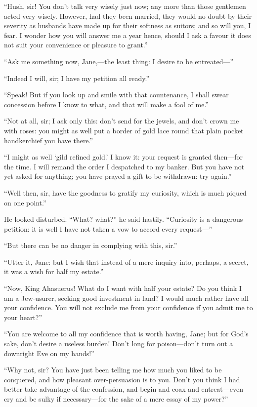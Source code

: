 \enquote{Hush, sir!  You don't talk very wisely just now; any more than
those gentlemen acted very wisely.  However, had they been married, they
would no doubt by their severity as husbands have made up for their
softness as suitors; and so will you, I fear.  I wonder how you will
answer me a year hence, should I ask a favour it does not suit your
convenience or pleasure to grant.}

\enquote{Ask me something now, Jane,---the least thing: I desire to be
entreated---}

\enquote{Indeed I will, sir; I have my petition all ready.}

\enquote{Speak!  But if you look up and smile with that countenance, I
shall swear concession before I know to what, and that will make a fool
of me.}

\enquote{Not at all, sir; I ask only this: don't send for the jewels,
and don't crown me with roses: you might as well put a border of gold
lace round that plain pocket handkerchief you have there.}

\enquote{I might as well \enquote{gild refined gold.}  I know it: your
request is granted then---for the time.  I will remand the order I
despatched to my banker.  But you have not yet asked for anything; you
have prayed a gift to be withdrawn: try again.}

\enquote{Well then, sir, have the goodness to gratify my curiosity,
which is much piqued on one point.}

He looked disturbed.  \enquote{What? what?} he said hastily. 
\enquote{Curiosity is a dangerous petition: it is well I have not taken
a vow to accord every request---}

\enquote{But there can be no danger in complying with this, sir.}

\enquote{Utter it, Jane: but I wish that instead of a mere inquiry into,
perhaps, a secret, it was a wish for half my estate.}

\enquote{Now, King Ahasuerus!  What do I want with half your estate?  Do
you think I am a Jew-usurer, seeking good investment in land?  I would
much rather have all your confidence.  You will not exclude me from your
confidence if you admit me to your heart?}

\enquote{You are welcome to all my confidence that is worth having,
Jane; but for God's sake, don't desire a useless burden!  Don't long for
poison---don't turn out a downright Eve on my hands!}

\enquote{Why not, sir?  You have just been telling me how much you liked
to be conquered, and how pleasant over-persuasion is to you.  Don't you
think I had better take advantage of the confession, and begin and coax
and entreat---even cry and be sulky if necessary---for the sake of a
mere essay of my power?}

